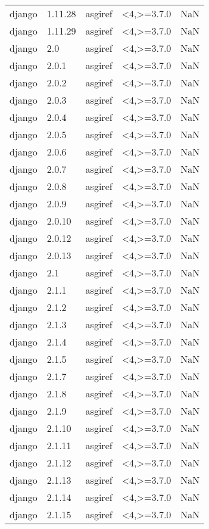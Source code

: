 \begin{tabular}{llllr}
django & 1.11.28 & asgiref & <4,>=3.7.0 & NaN \\
django & 1.11.29 & asgiref & <4,>=3.7.0 & NaN \\
django & 2.0 & asgiref & <4,>=3.7.0 & NaN \\
django & 2.0.1 & asgiref & <4,>=3.7.0 & NaN \\
django & 2.0.2 & asgiref & <4,>=3.7.0 & NaN \\
django & 2.0.3 & asgiref & <4,>=3.7.0 & NaN \\
django & 2.0.4 & asgiref & <4,>=3.7.0 & NaN \\
django & 2.0.5 & asgiref & <4,>=3.7.0 & NaN \\
django & 2.0.6 & asgiref & <4,>=3.7.0 & NaN \\
django & 2.0.7 & asgiref & <4,>=3.7.0 & NaN \\
django & 2.0.8 & asgiref & <4,>=3.7.0 & NaN \\
django & 2.0.9 & asgiref & <4,>=3.7.0 & NaN \\
django & 2.0.10 & asgiref & <4,>=3.7.0 & NaN \\
django & 2.0.12 & asgiref & <4,>=3.7.0 & NaN \\
django & 2.0.13 & asgiref & <4,>=3.7.0 & NaN \\
django & 2.1 & asgiref & <4,>=3.7.0 & NaN \\
django & 2.1.1 & asgiref & <4,>=3.7.0 & NaN \\
django & 2.1.2 & asgiref & <4,>=3.7.0 & NaN \\
django & 2.1.3 & asgiref & <4,>=3.7.0 & NaN \\
django & 2.1.4 & asgiref & <4,>=3.7.0 & NaN \\
django & 2.1.5 & asgiref & <4,>=3.7.0 & NaN \\
django & 2.1.7 & asgiref & <4,>=3.7.0 & NaN \\
django & 2.1.8 & asgiref & <4,>=3.7.0 & NaN \\
django & 2.1.9 & asgiref & <4,>=3.7.0 & NaN \\
django & 2.1.10 & asgiref & <4,>=3.7.0 & NaN \\
django & 2.1.11 & asgiref & <4,>=3.7.0 & NaN \\
django & 2.1.12 & asgiref & <4,>=3.7.0 & NaN \\
django & 2.1.13 & asgiref & <4,>=3.7.0 & NaN \\
django & 2.1.14 & asgiref & <4,>=3.7.0 & NaN \\
django & 2.1.15 & asgiref & <4,>=3.7.0 & NaN \\

\end{tabular}
